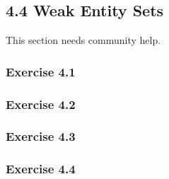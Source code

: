 \documentclass[../../main.tex]{subfiles}
\begin{document}
\subsection{4.4 Weak Entity Sets}

This section needs community help.

\subsubsection*{Exercise 4.1}

\subsubsection*{Exercise 4.2}

\subsubsection*{Exercise 4.3}

\subsubsection*{Exercise 4.4}
\end{document}
